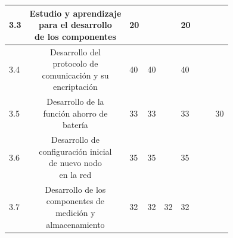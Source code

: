 \documentclass[11pt]{charter}
\begin{document}
\begin{table}
\begin{tabularx}{\linewidth}{@{}|X|c|X|X|X|X|X|X|X|@{}}
3.3 & \makecell{Estudio y aprendizaje \\ para el desarrollo  \\ de los componentes} & 20 &  &  & 20 & &  &\\ \hline
3.4 & \makecell{Desarrollo del \\ protocolo de \\ comunicación y su\\ encriptación} & 40 & 40 &  & 40 & &  &\\ \hline
3.5 & \makecell{Desarrollo de la \\ función ahorro de \\ batería} & 33 &  33 &  & 33 & & & 30 \\ \hline
3.6 & \makecell{Desarrollo de \\configuración inicial\\ de nuevo nodo \\ en la red} & 35 & 35 &  & 35 & &  & \\ \hline
3.7 & \makecell{Desarrollo de los \\ componentes de \\  medición y \\ almacenamiento} & 32 & 32 & 32 & 32 & & & \\ \hline

\end{tabularx}%
\end{table}
\end{document}
